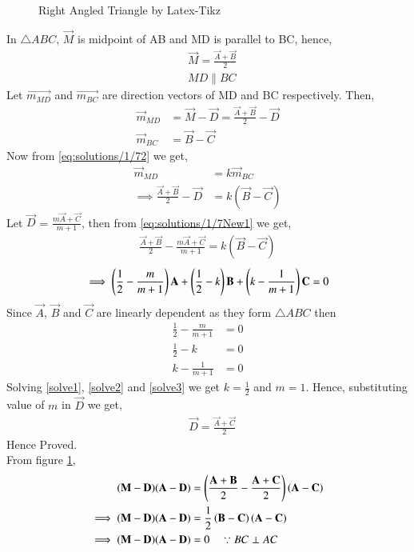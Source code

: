 \begin{figure}[!h]
\centering
\resizebox{\columnwidth}{!}{}
\caption{Right Angled Triangle by Latex-Tikz}
\label{myfig:solutions/1/7}
\end{figure}
In $\triangle{ABC}$, $\vec{M}$ is midpoint of AB and MD is parallel to BC, hence,
\begin{align}
&\vec{M} = \frac{\vec{A}+\vec{B}}{2}\label{eq:solutions/1/71}\\
&MD \parallel BC\label{eq:solutions/1/72}
\end{align}
Let $\vec{m_{MD}}$ and $\vec{m_{BC}}$ are direction vectors of MD and BC respectively. Then,
\begin{align}
\vec{m}_{MD} &= \vec{M} - \vec{D} = \frac{\vec{A}+\vec{B}}{2} - \vec{D}\\
\vec{m}_{BC} &= \vec{B} - \vec{C}
\end{align}
Now from \eqref{eq:solutions/1/72} we get,
\begin{align}
\vec{m}_{MD} &= k\vec{m}_{BC}\\
\implies\frac{\vec{A}+\vec{B}}{2} - \vec{D} &= k(\vec{B} - \vec{C})\label{eq:solutions/1/7New1}
\end{align}
Let $\vec{D}$ = $\frac{m\vec{A}+\vec{C}}{m+1}$, then from \eqref{eq:solutions/1/7New1} we get,
\begin{align}
\frac{\vec{A}+\vec{B}}{2} - \frac{m\vec{A}+\vec{C}}{m+1} = k(\vec{B} - \vec{C})
\end{align}
\begin{align}
\implies\left(\frac{1}{2}-\frac{m}{m+1}\right)\mathbf{A}+\left(\frac{1}{2}-k\right)\mathbf{B}+\left(k-\frac{1}{m+1}\right)\mathbf{C} =0
\end{align}
Since $\vec{A}$, $\vec{B}$ and $\vec{C}$ are linearly dependent as they form $\triangle{ABC}$ then 
\begin{align}
\frac{1}{2}-\frac{m}{m+1} &= 0\label{solve1}\\
\frac{1}{2}-k & = 0\label{solve2}\\
k-\frac{1}{m+1} &= 0\label{solve3}
\end{align}
Solving \eqref{solve1}, \eqref{solve2} and \eqref{solve3} we get $k=\frac{1}{2}$ and $m = 1$. Hence, substituting value of $m$ in $\vec{D}$ we get,
\begin{align}
&\vec{D} = \frac{\vec{A}+\vec{C}}{2}\label{eq:solutions/1/73}
\end{align}
Hence Proved.\\
From figure \ref{myfig:solutions/1/7},
\begin{align}
(\mathbf{M}-\mathbf{D})(\mathbf{A}-\mathbf{D}) &=\left(\frac{\mathbf{A}+\mathbf{B}}{2} - \frac{\mathbf{A}+\mathbf{C}}{2}\right)(\mathbf{A}-\mathbf{C})\\
\implies(\mathbf{M}-\mathbf{D})(\mathbf{A}-\mathbf{D}) &=\frac{1}{2}\left(\mathbf{B}-\mathbf{C}\right)(\mathbf{A}-\mathbf{C})\\
\implies(\mathbf{M}-\mathbf{D})(\mathbf{A}-\mathbf{D}) &=0\label{eq:solutions/1/74}\quad \because BC\perp AC
\end{align}
